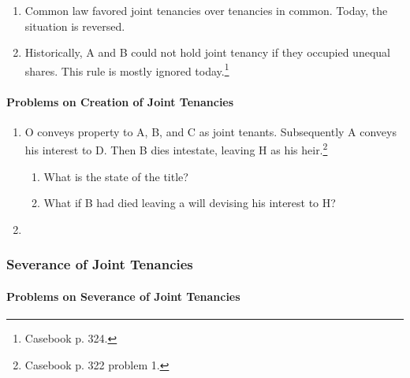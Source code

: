 \begin{enumerate}
\begin{enumerate}
\begin{enumerate}
            a joint tenancy into a tenancy in common by conveying his interest 
            to a third party. 
        \end{enumerate}
        \item \textbf{Tenancy by the entirety}: created only in husband and 
        wife.\footnote{Casebook p. 321.}
        \begin{enumerate}
            \item Requires the four unities, plus a fifth---marriage.
            \item Today it exists in less than half the states.
        \end{enumerate}
    \end{enumerate}
    \item Common law favored joint tenancies over tenancies in common. Today, 
    the situation is reversed.
    \item Historically, A and B could not hold joint tenancy if they occupied 
    unequal shares. This rule is mostly ignored today.\footnote{Casebook p. 
    324.}
\end{enumerate}

\paragraph{Problems on Creation of Joint Tenancies}

\begin{enumerate}
    \item O conveys property to A, B, and C as joint tenants. Subsequently A 
    conveys his interest to D. Then B dies intestate, leaving H as his 
    heir.\footnote{Casebook p. 322 problem 1.}
    \begin{enumerate}
        \item What is the state of the title? %
        \item What if B had died leaving a will devising his interest to H?
    \end{enumerate}
    \item %
\end{enumerate}

\subsubsection{Severance of Joint Tenancies}

\paragraph{Problems on Severance of Joint Tenancies}

